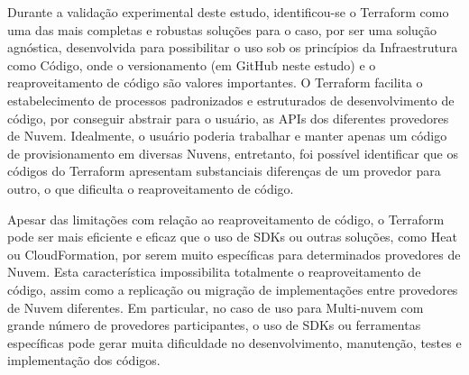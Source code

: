 \documentclass[12pt]{article}
\begin{document}
	Durante a validação experimental deste estudo, identificou-se o Terraform como uma das mais completas e robustas soluções para o caso, por ser uma solução agnóstica, desenvolvida para possibilitar o uso sob os princípios da Infraestrutura como Código, onde o versionamento (em GitHub neste estudo) e o reaproveitamento de código são valores importantes. O Terraform facilita o estabelecimento de processos padronizados e estruturados de desenvolvimento de código, por conseguir abstrair para o usuário, as APIs dos diferentes provedores de Nuvem. Idealmente, o usuário poderia trabalhar e manter apenas um código de provisionamento em diversas Nuvens, entretanto, foi possível identificar que os códigos do Terraform apresentam substanciais diferenças de um provedor para outro, o que dificulta o reaproveitamento de código. 
	
	Apesar das limitações com relação ao reaproveitamento de código, o Terraform pode ser mais eficiente e eficaz que o uso de SDKs ou outras soluções, como Heat ou CloudFormation, por serem muito específicas para determinados provedores de Nuvem. Esta característica impossibilita totalmente o reaproveitamento de código, assim como a replicação ou migração de implementações entre provedores de Nuvem diferentes. Em particular, no caso de uso para Multi-nuvem com grande número de provedores participantes, o uso de SDKs ou ferramentas específicas pode gerar muita dificuldade no desenvolvimento, manutenção, testes e implementação dos códigos.
	
	
	\nocite{Bond:2015}
	
	\newpage

		
	
	
\end{document}
